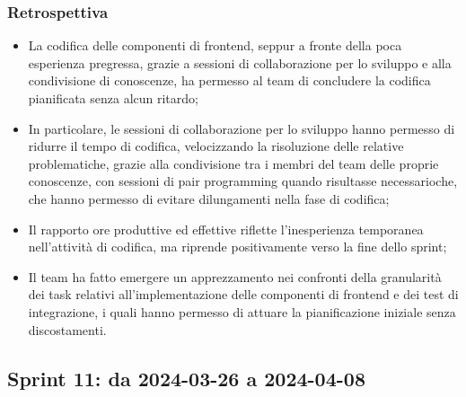\documentclass[10pt, a4paper]{article}
\begin{document}
\subsubsection{Retrospettiva}
\begin{itemize}
    \item La codifica delle componenti di frontend, seppur a fronte della poca esperienza pregressa, grazie a sessioni di collaborazione per lo sviluppo e alla condivisione di conoscenze, ha permesso al team di concludere la codifica pianificata senza alcun ritardo;
     \item In particolare, le sessioni di collaborazione per lo sviluppo hanno permesso di ridurre il tempo di codifica, velocizzando la risoluzione 
     delle relative problematiche, grazie alla condivisione tra i membri del team delle proprie conoscenze, con sessioni di pair programming quando 
     risultasse necessarioche, che hanno permesso di evitare dilungamenti nella fase di codifica;
    \item Il rapporto ore produttive ed effettive riflette l'inesperienza temporanea nell'attività di codifica, ma riprende positivamente verso la fine dello sprint;
    \item Il team ha fatto emergere un apprezzamento nei confronti della granularità dei task relativi all'implementazione delle componenti di frontend e dei test di integrazione, i quali hanno permesso di attuare la pianificazione iniziale senza discostamenti.
\end{itemize}







\subsection{Sprint 11: da 2024-03-26 a 2024-04-08}
\end{document}
